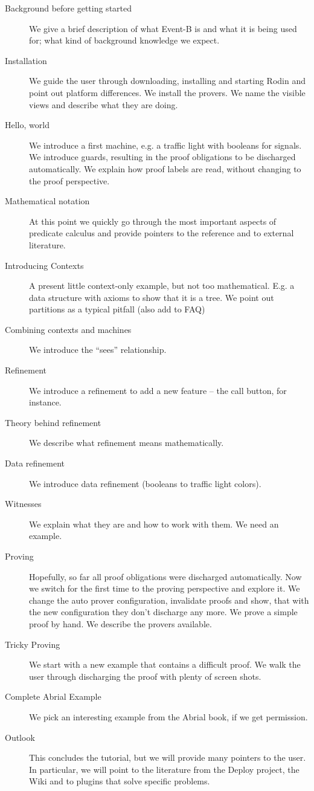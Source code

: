 \begin{description}
	\item[Background before getting started] We give a brief description of what Event-B is and what it is being used for; what kind of background knowledge we expect.
	\item[Installation] We guide the user through downloading, installing and starting Rodin and point out platform differences.  We install the provers.  We name the visible views and describe what they are doing.
	\item[Hello, world] We introduce a first machine, e.g. a traffic light with booleans for signals. 
      We introduce guards, resulting in the proof obligations to be discharged automatically.
      We explain how proof labels are read, without changing to the proof perspective.
	\item[Mathematical notation] At this point we quickly go through the most important aspects of predicate calculus and provide pointers to the reference and to external literature.
	\item[Introducing Contexts] A present little context-only example, but not too mathematical.  E.g. a data structure with axioms to show that it is a tree. We point out partitions as a typical pitfall (also add to FAQ)
	\item[Combining contexts and machines] We introduce the ``sees'' relationship.
	\item[Refinement] We introduce a refinement to add a new feature -- the call button, for instance.
	\item[Theory behind refinement] We describe what refinement means mathematically.
	\item[Data refinement] We introduce data refinement (booleans to traffic light colors).
	\item[Witnesses] We explain what they are and how to work with them.  We need an example.
	\item[Proving] Hopefully, so far all proof obligations were discharged automatically.  Now we switch for the first time to the proving perspective and explore it.
      We change the auto prover configuration, invalidate proofs and show, that with the new configuration they don't discharge any more.
      We prove a simple proof by hand.  We describe the provers available.
	\item[Tricky Proving] We start with a new example that contains a difficult proof.  We walk the user through discharging the proof with plenty of screen shots.
	\item[Complete Abrial Example] We pick an interesting example from the Abrial book, if we get permission.
	\item[Outlook] This concludes the tutorial, but we will provide many pointers to the user.  In particular, we will point to the literature from the Deploy project, the Wiki and to plugins that solve specific problems.
\end{description}




